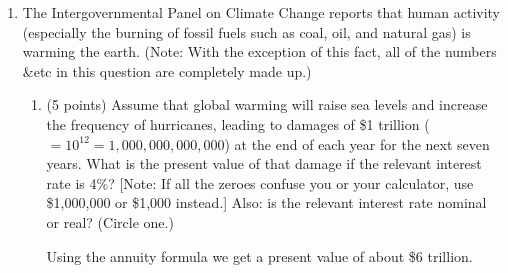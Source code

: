 \documentclass{article}
\begin{document}
\begin{enumerate}
\begin{enumerate}
\begin{KEY}
The predicted outcome is that Player 1 offers Player 2 a (2,2) split and Player 2 accepts. If Player 1 offers Player 2 any less, Player 2 can reject and get (1.5,1.5), and if Player 2 rejects the (2,2) offer then she'll only get 1.5 ounces of cake.

The predicted outcome is Pareto efficient, and in fact all accepted outcomes---(3,1), (2,2), and (1,3)---are Pareto efficient. The outcome (1.5,1.5) is Pareto inefficient; a Pareto improvement over it is (2,2).
\end{KEY}
    \end{enumerate}



















\item \begin{EXAM} The Intergovernmental Panel on Climate Change reports that human activity (especially the burning of fossil fuels such as coal, oil, and natural gas) is warming the earth. (Note: With the exception of this fact, all of the numbers \&etc in this question are completely made up.) \end{EXAM}

    \begin{enumerate}

    \item \begin{EXAM} (5 points) Assume that global warming will raise sea levels and increase the frequency of hurricanes, leading to damages of \$1 trillion ($=10^{12}=1,000,000,000,000$) at the end of each year for the next seven years. What is the present value of that damage if the relevant interest rate is 4\%? [Note: If all the zeroes confuse you or your calculator, use \$1,000,000 or \$1,000 instead.] Also: is the relevant interest rate nominal or real? (Circle one.) \label{gw1} \vspace{1.5in}\end{EXAM}

\begin{KEY}
Using the annuity formula we get a present value of about \$6 trillion.
\end{KEY}




\end{enumerate}
\end{enumerate}
\end{document}
